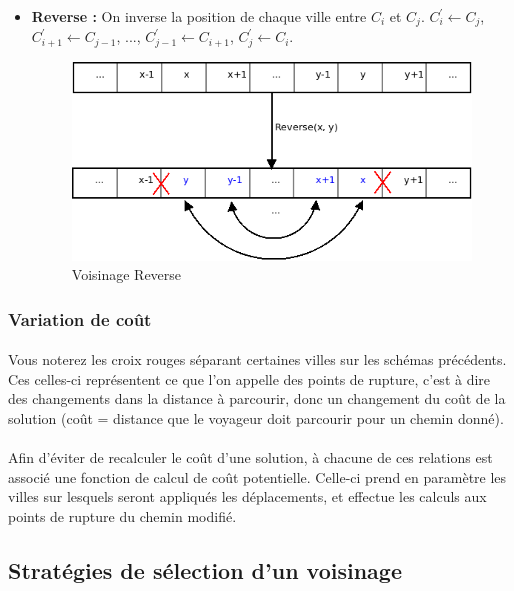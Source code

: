 \documentclass[a4paper,10pt]{report}
\begin{document}
\begin{itemize}
  \item \textbf{Reverse :} On inverse la position de chaque ville entre $C_i$ et
$C_j$. $C^{'}_i \gets C_j$, $C^{'}_{i+1} \gets C_{j-1}$, ..., $C^{'}_{j-1} \gets
C_{i+1}$, $C^{'}_j \gets C_i$.
  \begin{figure}[H]
    \begin{center}
      \includegraphics[width=\textwidth]{images/Reverse.png}
    \end{center}
    \caption{Voisinage Reverse}
  \end{figure}

\end{itemize}

\subsubsection{Variation de coût}
\paragraph{}
  Vous noterez les croix rouges séparant certaines villes sur les schémas
précédents. Ces celles-ci représentent ce que l'on appelle des points de
rupture, c'est à dire des changements dans la distance à parcourir, donc un
changement du coût de la solution (coût = distance que le voyageur doit
parcourir pour un chemin donné).
\paragraph{}
Afin d'éviter de recalculer le coût d'une solution, à chacune de ces relations
est associé une fonction de calcul de coût potentielle. Celle-ci prend en
paramètre les villes sur lesquels seront appliqués les déplacements, et effectue
les calculs aux points de rupture du chemin modifié.


\subsection{Stratégies de sélection d'un voisinage}
\end{document}
